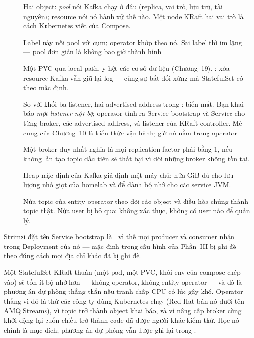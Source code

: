 \begin{description}
  \item[] Hai object: \emph{pool} nói Kafka chạy ở đâu (replica,
  vai trò, lưu trữ, tài nguyên); resource  nói nó hành xử
  thế nào. Một node KRaft hai vai trò là cách Kubernetes viết
   của Compose.
  \item[] Label này nối pool với cụm; operator khớp theo nó. Sai
  label thì im lặng --- pool đơn giản là không bao giờ thành hình.
  \item[] Một PVC qua local-path, y hệt các cơ sở dữ liệu
  (Chương~19). : xóa resource Kafka vẫn giữ
  lại log --- cùng sự bất đối xứng mà StatefulSet có theo mặc định.
  \item[] So với khối ba listener, hai advertised address trong
  : biến mất. Bạn khai báo \emph{một listener
  nội bộ}; operator tính ra Service bootstrap và Service cho từng
  broker, các advertised address, và listener của KRaft controller.
  Mê cung của Chương~10 là kiến thức vận hành; giờ nó nằm trong
  operator.
  \item[] Một broker duy nhất nghĩa là mọi replication factor
  phải bằng 1, nếu không lần tạo topic đầu tiên sẽ thất bại vì đòi
  những broker không tồn tại.
  \item[] Heap mặc định của Kafka giả định một máy chủ; nửa GiB
  đủ cho lưu lượng nhỏ giọt của homelab và để dành bộ nhớ cho các
  service JVM.
  \item[] Nửa topic của entity operator theo dõi các object
   và điều hòa chúng thành topic thật. Nửa user bị
  bỏ qua: không xác thực, không có user nào để quản lý.
\end{description}

Strimzi đặt tên Service bootstrap là ;
vì thế mọi producer và consumer nhận
trong Deployment của nó --- mặc định  trong cấu
hình của Phần~III bị ghi đè theo đúng cách mọi địa chỉ khác đã bị ghi
đè.

\begin{decision}
Một StatefulSet KRaft thuần (một pod, một PVC, khối env của compose
chép vào) sẽ tốn ít bộ nhớ hơn --- không operator, không entity
operator --- và đó là phương án dự phòng thẳng thắn nếu tranh chấp
CPU có lúc gây khó. Operator thắng vì đó là thứ các công ty dùng
Kubernetes chạy (Red Hat bán nó dưới tên AMQ Streams), vì topic trở
thành object khai báo, và vì nâng cấp broker cùng khởi động lại cuốn
chiếu trở thành code đã được người khác kiểm thử. Học nó chính là
mục đích; phương án dự phòng vẫn được ghi lại trong
.
\end{decision}

